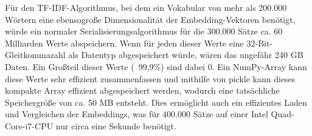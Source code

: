Für den TF-IDF-Algorithmus, bei dem ein Vokabular von mehr als 200.000 Wörtern eine ebensogroße Dimensionalität der Embedding-Vektoren benötigt, würde ein normaler Serialisierungsalgorithmus für die 300.000 Sätze ca. 60 Milliarden Werte abspeichern.
Wenn für jeden dieser Werte eine 32-Bit-Gleitkommazahl als Datentyp abgespeichert würde, wären das ungefähr 240 GB Daten.
Ein Großteil dieser Werte (~99,9\%) sind dabei 0.
Ein NumPy-Array kann diese Werte sehr effizient zusammenfassen und mithilfe von pickle kann dieses kompakte Array effizient abgespeichert werden, wodurch eine tatsächliche Speichergröße von ca. 50 MB entsteht.
Dies ermöglicht auch ein effizientes Laden und Vergleichen der Embeddings, was für 400.000 Sätze auf einer Intel Quad-Core-i7-CPU nur circa eine Sekunde benötigt.